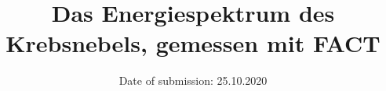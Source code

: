 

\subject{Lehrstuhlversuch im SS2020}
\title{Das Energiespektrum des Krebsnebels, gemessen mit FACT}
\date{%
  Date of submission: 25.10.2020
}


\maketitle
\thispagestyle{empty}
\tableofcontents
\newpage







%


